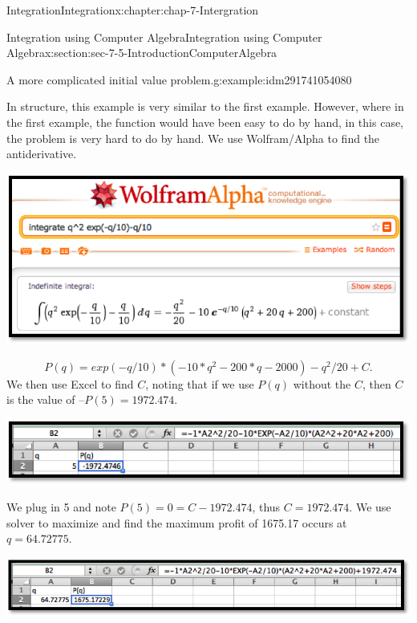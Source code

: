\documentclass[oneside,10pt,]{book}
\numberwithin{equation}{section}
\begin{document}
\begin{chapterptx}{Integration}{}{Integration}{}{}{x:chapter:chap-7-Intergration}
\begin{sectionptx}{Integration using Computer Algebra}{}{Integration using Computer Algebra}{}{}{x:section:sec-7-5-IntroductionComputerAlgebra}
\begin{example}{A more complicated initial value problem.}{g:example:idm291741054080}
\par
In structure, this example is very similar to the first example.  However, where in the first example, the function would have been easy to do by hand, in this case, the problem is very hard to do by hand.  We use Wolfram\slash{}Alpha to find the antiderivative.%
\begin{sidebyside}{1}{0.15}{0.15}{0}%
\begin{sbspanel}{0.7}%
\includegraphics[width=\linewidth]{images/sec7-5-20.png}
\end{sbspanel}%
\end{sidebyside}%
%
\begin{equation*}
P(q) = exp(-q/10)*(-10*q^2-200*q-2000)-q^2/20+C.
\end{equation*}
We then use Excel to find \(C\), noting that if we use \(P(q)\) without the \(C\), then \(C\) is the value of \(–P(5) = 1972.474\).%
\begin{sidebyside}{1}{0.15}{0.15}{0}%
\begin{sbspanel}{0.7}%
\includegraphics[width=\linewidth]{images/sec7-5-21.png}
\end{sbspanel}%
\end{sidebyside}%
\par
We plug in 5 and note \(P(5) = 0 = C-1972.474\), thus \(C = 1972.474\).  We use solver to maximize and find the maximum profit of \textdollar{}1675.17 occurs at \(q=64.72775\).%
\begin{sidebyside}{1}{0.05}{0.05}{0}%
\begin{sbspanel}{0.9}%
\includegraphics[width=\linewidth]{images/sec7-5-22.png}

\end{sbspanel}
\end{sidebyside}
\end{example}
\end{sectionptx}
\end{chapterptx}
\end{document}
